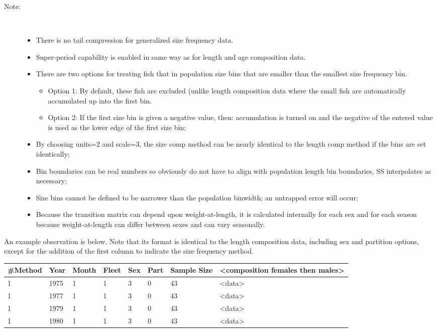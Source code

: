 \begin{description}
	\item[Note:]\
	\begin{itemize}
		\item There is no tail compression for generalized size frequency data.
		\item Super-period capability is enabled in same way as for length and age composition data.
		\item There are two options for treating fish that in population size bins that are smaller than the smallest size frequency bin.
		\begin{itemize}
			\item Option 1:  By default, these fish are excluded (unlike length composition data where the small fish are automatically accumulated up into the first bin.
			\item Option 2:  If the first size bin is given a negative value, then:  accumulation is turned on and the negative of the entered value is used as the lower edge of the first size bin;
		\end{itemize}
		\item By choosing units=2 and scale=3, the size comp method can be nearly identical to the length comp method if the bins are set identically;
		\item Bin boundaries can be real numbers so obviously do not have to align with population length bin boundaries, SS interpolates as necessary;
		\item Size bins cannot be defined to be narrower than the population binwidth; an untrapped error will occur;
		\item Because the transition matrix can depend upon weight-at-length, it is calculated internally for each sex and for each season because weight-at-length can differ between sexes and can vary seasonally.
	\end{itemize}
\end{description}

An example observation is below.  Note that its format is identical to the length composition data, including sex and partition options, except for the addition of the first column to indicate the size frequency method.

\begin{center}
	\begin{tabular}{p{1.5cm} p{1cm} p{1cm} p{1cm} p{1cm} p{1cm} p{1cm} p{6cm}}
		\hline
		\#Method & Year & Month & Fleet & Sex & Part & Sample Size & <composition females then males>\\
		\hline
		1 & 1975 & 1 & 1 & 3 & 0 & 43 & <data> \\
		1 & 1977 & 1 & 1 & 3 & 0 & 43 & <data> \\
		1 & 1979 & 1 & 1 & 3 & 0 & 43 & <data> \\
		1 & 1980 & 1 & 1 & 3 & 0 & 43 & <data> \\
		\hline
	\end{tabular}
\end{center}

